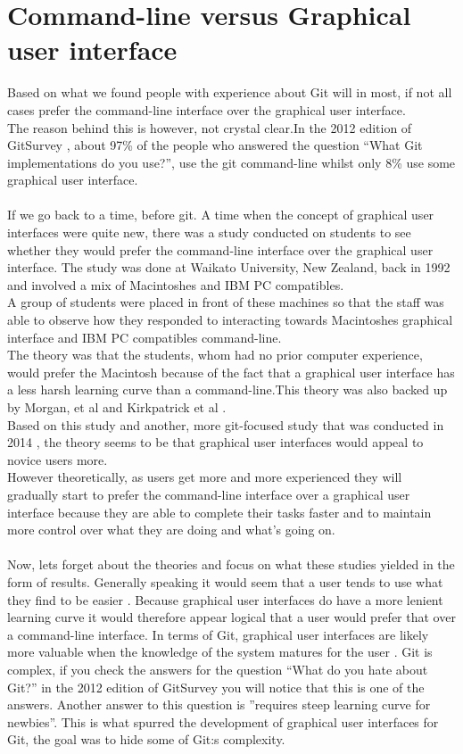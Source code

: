 \documentclass[a4paper,oneside]{bth} %
\begin{document}
			\section{Command-line versus Graphical user interface}
			Based on what we found people with experience about Git will in most, if not all cases prefer the command-line interface over the graphical user interface.\\
			The reason behind this is however, not crystal clear.In the 2012 edition of GitSurvey \cite{GitUserSurvey}, about 97\% of the people who answered the question “What Git implementations do you use?”, use the git command-line whilst only 8\% use some graphical user interface.\\\\
			If we go back to a time, before git. A time when the concept of graphical user interfaces were quite new, there was a study conducted on students to see whether they would prefer the command-line interface over the graphical user interface. The study was done at Waikato University, New Zealand, back in 1992 and involved a mix of Macintoshes and IBM PC compatibles.\\
			A group of students were placed in front of these machines so that the staff was able to observe how they responded to interacting towards Macintoshes graphical interface and IBM PC compatibles command-line.\\
			The theory was that the students, whom had no prior computer experience, would prefer the Macintosh because of the fact that a graphical user interface has a less harsh learning curve than a command-line.This theory was also backed up by Morgan, et al \cite{MouseToRat} and Kirkpatrick et al \cite{MacVsWindows}.\\
			Based on this study and another, more git-focused study that was conducted in 2014 \cite{GitInClassroom}, the theory seems to be that graphical user interfaces would appeal to novice users more.\\
			However theoretically, as users get more and more experienced they will gradually start to prefer the command-line interface over a graphical user interface because they are able to complete their tasks faster and to maintain more control over what they are doing and what's going on.\\\\
			Now, lets forget about the theories and focus on what these studies yielded in the form of results. Generally speaking it would seem that a user tends to use what they find to be easier \cite{Treweek}. Because graphical user interfaces do have a more lenient learning curve it would therefore appear logical that a user would prefer that over a command-line interface. In terms of Git, graphical user interfaces are likely more valuable when the knowledge of the system matures for the user \cite{GitInClassroom}. Git is complex, if you check the answers for the question “What do you hate about Git?” in the 2012 edition of GitSurvey you will notice that this is one of the answers. Another answer to this question is ”requires steep learning curve for newbies”. This is what spurred the development of graphical user interfaces for Git, the goal was to hide some of Git:s complexity. \cite{WrongWithGit}
			
\end{document}
